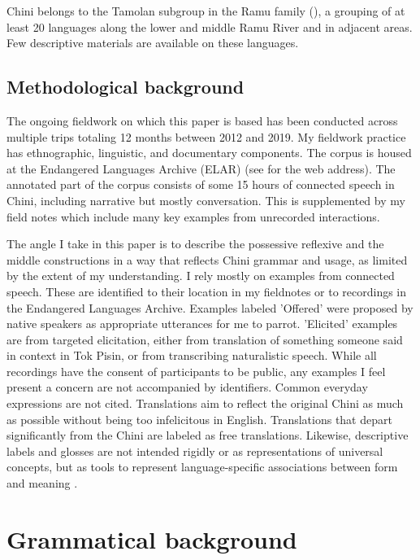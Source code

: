 \documentclass[output=paper]{langscibook}
\begin{document}
Chini belongs to the Tamolan subgroup in the Ramu family (\citealt{Brooks2018Realis, Foley2005, Zgraggen1971}), a grouping of at least 20 languages along the lower and middle Ramu River and in adjacent areas. Few descriptive materials are available on these languages.

\subsection{{Methodological} {background}}\label{sec:brooks:1.2}

The ongoing fieldwork on which this paper is based has been conducted across multiple trips totaling 12 months between 2012 and 2019. My fieldwork practice has ethnographic, linguistic, and documentary components. The corpus is housed at the Endangered Languages Archive (ELAR) (see \citealt{Brooks2018Documentation} for the web address). The annotated part of the corpus consists of some 15 hours of connected speech in Chini, including narrative but mostly conversation. This is supplemented by my field notes which include many key examples from unrecorded interactions.

The angle I take in this paper is to describe the possessive reflexive and the middle constructions in a way that reflects Chini grammar and usage, as limited by the extent of my understanding. I rely mostly on examples from connected speech. These are identified to their location in my fieldnotes or to recordings in the Endangered Languages Archive. Examples labeled 'Offered' were proposed by native speakers as appropriate utterances for me to parrot. 'Elicited' examples are from targeted elicitation, either from translation of something someone said in context in Tok Pisin, or from transcribing naturalistic speech. While all recordings have the consent of participants to be public, any examples I feel present a concern are not accompanied by identifiers. Common everyday expressions are not cited. Translations aim to reflect the original Chini as much as possible without being too infelicitous in English. Translations that depart significantly from the Chini are labeled as free translations. Likewise, descriptive labels and glosses are not intended rigidly or as representations of universal concepts, but as tools to represent language-specific associations between form and meaning \citep{Reesink2008}.

\section{{Grammatical} {background}}\label{sec:brooks:2}
\end{document}
